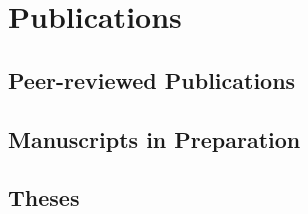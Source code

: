 \ifacademic
  \section{Publications}
  
  \subsection{Peer-reviewed Publications}
    \begin{refsection}
      \vspace{2mm}
      \onehalfspacing
      \nocite{
        GironsLopez2020,
        Worman2020,
        DiBaldassarre2018,
        Breinl2017,
        GironsLopez2017,
        GironsLopez2016a,
        Mbanguka2016,
        GironsLopez2015
      }
      \printbibliography[heading=none]
    \end{refsection}

    
  \subsection{Manuscripts in Preparation}
    \begin{refsection}
      \vspace{2mm}
      \onehalfspacing
      \nocite{
        GironsLopez2020a,
      }
      \printbibliography[heading=none]
    \end{refsection}
  
  \subsection{Theses}
    \begin{refsection}
      \vspace{2mm}
      \onehalfspacing
      \nocite{
        GironsLopez2016,
        GironsLopez2011
      }
      \printbibliography[heading=none]
    \end{refsection}
  
  \newpage

